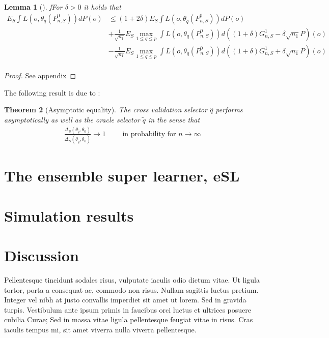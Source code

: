 \documentclass[11pt, a4paper]{article}
\newtheorem{theorem}{Theorem}
\newtheorem{lemma}[theorem]{Lemma}
\theoremstyle{definition}
\theoremstyle{remark}
\newcommand{\cl}{q}
\begin{document}
\begin{lemma}[\cite{vaart06}]
   fFor $ \delta > 0 $ it holds that
   \begin{align*}
       E_{S} \int L(o, \theta_{ \hat{\cl}}(P_{n, S}^{0})) dP(o) &\leq (1 + 2 \delta) E_{S} \int L(o, \theta_{ \tilde{\cl} }(P_{n, S}^{0})) d P(o) \\ 
                                                                &+\frac{1}{\sqrt{n_1} } E_{S} \max_{1 \leq \cl \leq p} \int L(o, \theta_{\cl}(P_{n, S}^{0})) d ((1 + \delta) G_{n,S}^{1} - \delta \sqrt{n_1} P)(o)  \\
                                                                &-\frac{1}{\sqrt{n_1} } E_{S} \max_{1 \leq \cl \leq p} \int L(o, \theta_{\cl}(P_{n, S}^{0})) d ((1 + \delta) G_{n,S}^{1} + \delta \sqrt{n_1} P)(o)  \\
   \end{align*}
\end{lemma}
\begin{proof}
    See appendix
\end{proof}


The following result is due to \cite{laan03}: 
\begin{theorem}[Asymptotic equality]
    The cross validation selector $ \hat{\cl} $ performs asymptotically as well as the oracle selector $ \tilde{\cl} $ in the sense that 
    \begin{align*}
        \frac{\Delta_{S}( \theta_{ \hat{\cl} } , \theta_0 )}{ \Delta_{S}( \theta_{ \tilde{\cl} } , \theta_0) } \to 1 \qquad \text{ in probability for } n \to \infty
    \end{align*}
\end{theorem}


\section{The ensemble super learner, eSL}
\section{Simulation results}
\section{Discussion}
Pellentesque tincidunt sodales risus, vulputate iaculis odio dictum vitae. Ut ligula tortor, porta a consequat ac, commodo non risus. Nullam sagittis luctus pretium. Integer vel nibh at justo convallis imperdiet sit amet ut lorem. Sed in gravida turpis. Vestibulum ante ipsum primis in faucibus orci luctus et ultrices posuere cubilia Curae; Sed in massa vitae ligula pellentesque feugiat vitae in risus. Cras iaculis tempus mi, sit amet viverra nulla viverra pellentesque.
\end{document}
